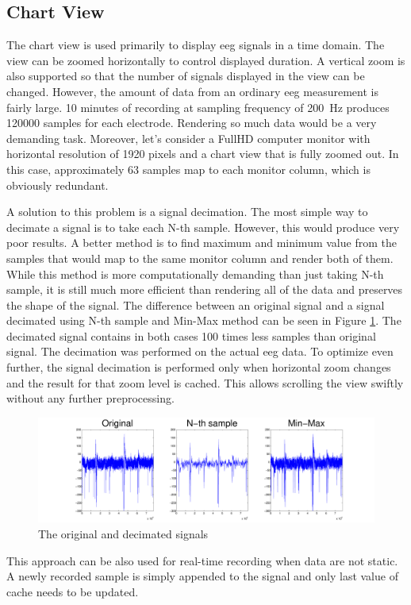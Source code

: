 \subsection{Chart View}
\label{ssec:ChartView}
The chart view is used primarily to display \gls{eeg} signals in a time domain. The view can be zoomed horizontally to control displayed duration. A vertical zoom is also supported so that the number of signals displayed in the view can be changed. However, the amount of data from an ordinary \gls{eeg} measurement is fairly large. 10 minutes of recording at sampling frequency of \SI{200}{\Hz} produces 120000 samples for each electrode. Rendering so much data would be a very demanding task. Moreover, let's consider a FullHD computer monitor with horizontal resolution of 1920 pixels and a chart view that is fully zoomed out. In this case, approximately 63 samples map to each monitor column, which is obviously redundant.

A solution to this problem is a signal decimation. The most simple way to decimate a signal is to take each N-th sample. However, this would produce very poor results. A better method is to find maximum and minimum value from the samples that would map to the same monitor column and render both of them. While this method is more computationally demanding than just taking N-th sample, it is still much more efficient than rendering all of the data and preserves the shape of the signal. The difference between an original signal and a signal decimated using N-th sample and Min-Max method can be seen in Figure \ref{fig:SignalDecimation}. The decimated signal contains in both cases 100 times less samples than original signal. The decimation was performed on the actual \gls{eeg} data. To optimize even further, the signal decimation is performed only when horizontal zoom changes and the result for that zoom level is cached. This allows scrolling the view swiftly without any further preprocessing.
\begin{figure}[htb]
	\centering
	\includegraphics[width=1\linewidth]{fig/signalDec.pdf}
	\caption{The original and decimated signals}
	\label{fig:SignalDecimation}
\end{figure}
This approach can be also used for real-time recording when data are not static. A newly recorded sample is simply appended to the signal and only last value of cache needs to be updated.  

